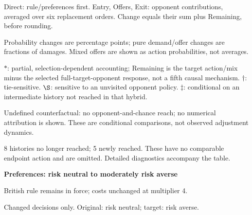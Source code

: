 \documentclass[10pt]{article}
\begin{document}
{\footnotesize Direct: rule/preferences first. Entry, Offers, Exit: opponent contributions, averaged over six replacement orders. Change equals their sum plus Remaining, before rounding.\par
Probability changes are percentage points; pure demand/offer changes are fractions of damages. Mixed offers are shown as action probabilities, not averages.\par
$*$: partial, selection-dependent accounting; Remaining is the target action/mix minus the selected full-target-opponent response, not a fifth causal mechanism. $\dagger$: tie-sensitive. $\S$: sensitive to an unvisited opponent policy. $\ddagger$: conditional on an intermediate history not reached in that hybrid.\par
Undefined counterfactual: no opponent-and-chance reach; no numerical attribution is shown. These are conditional comparisons, not observed adjustment dynamics.\par
8 histories no longer reached; 5 newly reached. These have no comparable endpoint action and are omitted. Detailed diagnostics accompany the table.}\par
\clearpage
{\large\bfseries Preferences: risk neutral to moderately risk averse}\par
British rule remains in force; costs unchanged at multiplier 4.\par
{\small Changed decisions only. Original: risk neutral; target: risk averse.}\par
\end{document}
